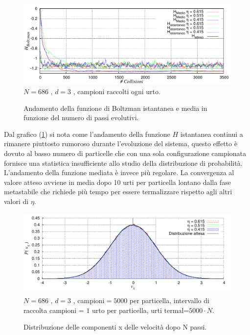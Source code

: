 \documentclass[11pt]{article}
\theoremstyle{plain}
\theoremstyle{remark}
\begin{document}
\begin{figure}[htbp]
\centering
	\caption[Sfere Rigide$/$Preliminari\_Termalizzazione.cpp]{Andamento della funzione di Boltzman istantanea e media in funzione del numero di passi evolutivi.}
	\vspace{-15pt}
	\includegraphics[scale=0.95]{Immagini/Rigide/HvsStep3D}
	\newline\footnotesize{$N= 686$ , $d=3$ , campioni raccolti ogni urto.}
	\label{fig: Termalizzazione}
\end{figure}

Dal grafico (\ref{fig: Termalizzazione}) si nota come l'andamento della funzione $H$ istantanea continui a rimanere piuttosto rumoroso durante l'evoluzione del sistema, questo effetto è dovuto al basso numero di particelle che con una sola configurazione campionata fornisce una statistica insufficiente allo studio della distribuzione di probabilità.
\newline
L'andamento della funzione mediata è invece più regolare. La convergenza al valore atteso avviene in media dopo 10 urti per particella lontano dalla fase metastabile che richiede più tempo per essere termalizzare rispetto agli altri valori di $\eta$.

\begin{figure}[htbp]
\centering
\caption[Sfere Rigide$/$Preliminari\_Termalizzazione.cpp]{Distribuzione delle componenti x delle velocità dopo N passi.}
	\vspace{-15pt}
	\includegraphics[scale=0.95]{Immagini/Rigide/DistroVx}
	\newline
	\footnotesize{$N= 686$ , $d=3$ , campioni$= 5000$ per particella, intervallo di raccolta campioni = $1$ urto per particella,  urti termal=$ 5000 \cdot N$.}
	\label{fig: IstoTermalizzazione}
\end{figure}
\end{document}
